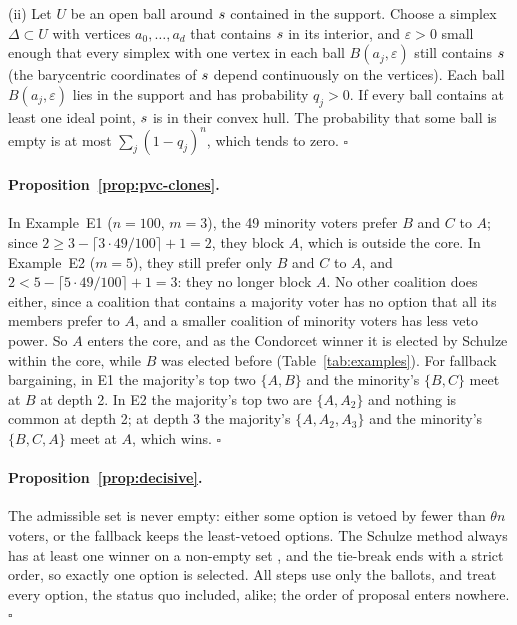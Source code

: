 (ii) Let $U$ be an open ball around $s$ contained in the support. Choose a simplex
$\Delta \subset U$ with vertices $a_0, \dots, a_d$ that contains $s$ in its interior, and $\varepsilon > 0$
small enough that every simplex with one vertex in each ball $B(a_j, \varepsilon)$ still contains $s$
(the barycentric coordinates of $s$ depend continuously on the vertices). Each ball $B(a_j,\varepsilon)$
lies in the support and has probability $q_j > 0$. If every ball contains at least one ideal point,
$s$ is in their convex hull. The probability that some ball is empty is at most
$\sum_j (1 - q_j)^n$, which tends to zero. \hfill$\square$

\paragraph{Proposition~\ref{prop:pvc-clones}.}
In Example~E1 ($n = 100$, $m = 3$), the 49 minority voters prefer $B$ and $C$ to $A$; since
$2 \ge 3 - \lceil 3 \cdot 49/100 \rceil + 1 = 2$, they block $A$, which is outside the core. In Example~E2
($m = 5$), they still prefer only $B$ and $C$ to $A$, and $2 < 5 - \lceil 5 \cdot 49/100 \rceil + 1 = 3$:
they no longer block $A$. No other coalition does either, since a coalition that contains a majority
voter has no option that all its members prefer to $A$, and a smaller coalition of minority voters has
less veto power. So $A$ enters the core, and as the Condorcet winner it is elected by Schulze within the
core, while $B$ was elected before (Table~\ref{tab:examples}). For fallback bargaining, in E1 the
majority's top two $\{A, B\}$ and the minority's $\{B, C\}$ meet at $B$ at depth 2. In E2 the majority's
top two are $\{A, A_2\}$ and nothing is common at depth 2; at depth 3 the majority's $\{A, A_2, A_3\}$ and
the minority's $\{B, C, A\}$ meet at $A$, which wins. \hfill$\square$

\paragraph{Proposition~\ref{prop:decisive}.}
The admissible set is never empty: either some option is vetoed by fewer than $\theta n$ voters, or the
fallback keeps the least-vetoed options. The Schulze method always has at least one winner on a non-empty
set \citep{Schulze2011}, and the tie-break ends with a strict order, so exactly one option is selected. All
steps use only the ballots, and treat every option, the status quo included, alike; the order of
proposal enters nowhere. \hfill$\square$

